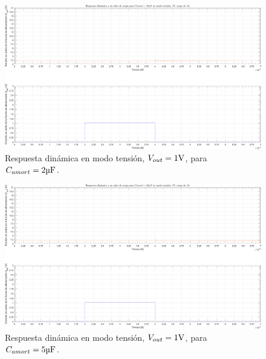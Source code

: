 \clearpage

\begin{figure}[H] %
\begin{center}
\includegraphics[width=1.1 \textwidth, angle=90]{./img/plots/dynamic/power_supply_CAMORT_10u_STEP_Modo2.png}
\caption{\label{fig:fig_power_supply_CAMORT_STEP_10u_Modo2}\footnotesize{Respuesta dinámica en modo tensión, $V_{out} = 1 \si[per-mode=symbol]{\volt}$, para $C_{amort} = 2 \si[per-mode=symbol]{\micro\farad} $.}}
\end{center}
\end{figure}

\clearpage

\begin{figure}[H] %
\begin{center}
\includegraphics[width=1.1 \textwidth, angle=90]{./img/plots/dynamic/power_supply_CAMORT_22u_STEP_Modo2.png}
\caption{\label{fig:fig_power_supply_CAMORT_STEP_22u_Modo2}\footnotesize{Respuesta dinámica en modo tensión, $V_{out} = 1 \si[per-mode=symbol]{\volt}$, para $C_{amort} = 5 \si[per-mode=symbol]{\micro\farad} $.}}
\end{center}
\end{figure}

\clearpage

